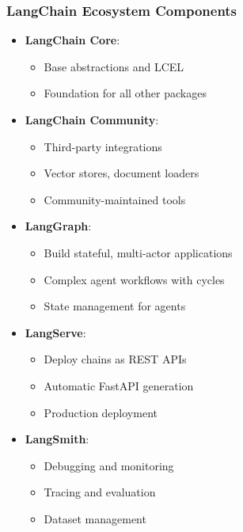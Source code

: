\begin{frame}\frametitle{LangChain Ecosystem Components}

\begin{itemize}
\item \textbf{LangChain Core}:
    \begin{itemize}
    \item Base abstractions and LCEL
    \item Foundation for all other packages
    \end{itemize}

\item \textbf{LangChain Community}:
    \begin{itemize}
    \item Third-party integrations
    \item Vector stores, document loaders
    \item Community-maintained tools
    \end{itemize}

\item \textbf{LangGraph}:
    \begin{itemize}
    \item Build stateful, multi-actor applications
    \item Complex agent workflows with cycles
    \item State management for agents
    \end{itemize}

\item \textbf{LangServe}:
    \begin{itemize}
    \item Deploy chains as REST APIs
    \item Automatic FastAPI generation
    \item Production deployment
    \end{itemize}

\item \textbf{LangSmith}:
    \begin{itemize}
    \item Debugging and monitoring
    \item Tracing and evaluation
    \item Dataset management
    \end{itemize}
\end{itemize}

\end{frame}

